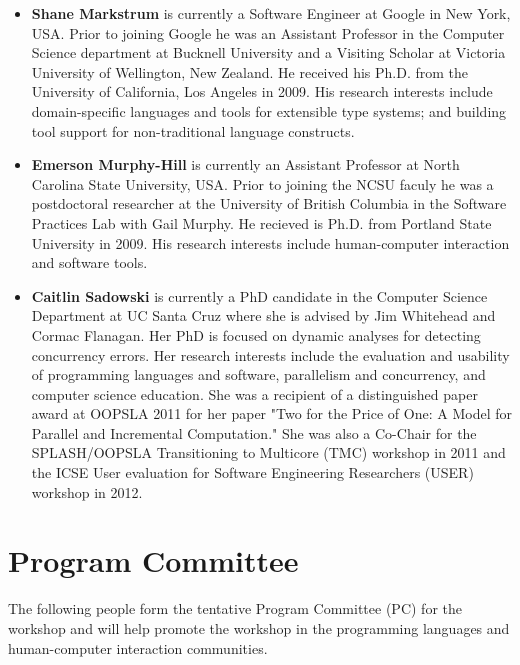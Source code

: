 \documentclass{sigplanconf}
\begin{document}
\begin{itemize}
\item \textbf{Shane Markstrum} is currently a Software Engineer at Google in New York, USA. Prior to joining Google he was an Assistant Professor in the Computer Science
  department at Bucknell University and a Visiting Scholar at Victoria University of Wellington, New Zealand. He received his Ph.D. from the University of
  California, Los Angeles in 2009. His research interests include
  domain-specific languages and tools for extensible type systems; and 
  building tool support for non-traditional language constructs.
  
\item \textbf{Emerson Murphy-Hill} is currently an Assistant Professor at North Carolina State University, USA. Prior to joining the NCSU faculy he was a postdoctoral researcher at the University of British Columbia in the Software Practices Lab with Gail Murphy. 
  He recieved is Ph.D. from Portland State University in 2009.
  His research interests include human-computer interaction and software tools. 

\item \textbf{Caitlin Sadowski} is currently a PhD candidate in the 
  Computer Science Department at UC Santa Cruz where she is advised by Jim Whitehead and Cormac Flanagan. Her PhD is focused on dynamic analyses for detecting concurrency errors. %
 Her research interests include the evaluation and usability of programming languages and software, parallelism and concurrency, and computer science education. She was a recipient of a distinguished paper award at OOPSLA 2011 for her paper "Two for the Price of One: A Model for Parallel and Incremental Computation." 
 She was also a Co-Chair for the SPLASH/OOPSLA Transitioning to Multicore (TMC) workshop in 2011 and the ICSE User evaluation for Software Engineering Researchers (USER) workshop in 2012. 
\end{itemize}

\section{Program Committee}

The following people form the tentative Program Committee (PC) for the workshop and will help promote the workshop in the programming languages and human-computer interaction communities.
\end{document}
